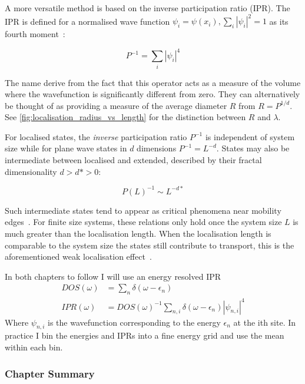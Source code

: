A more versatile method is based on the inverse participation ratio (IPR). The IPR is defined for a normalised wave function \(\psi_i = \psi(x_i), \sum_i |\psi_i|^2 = 1\) as its fourth moment~\autocite{kramerLocalizationTheoryExperiment1993}:

\[
P^{-1} = \sum_i |\psi_i|^4
\]

The name derive from the fact that this operator acts as a measure of the volume where the wavefunction is significantly different from zero. They can alternatively be thought of as providing a measure of the average diameter \(R\) from \(R = P^{1/d}\). See \cref{fig:localisation_radius_vs_length} for the distinction between \(R\) and \(\lambda\).

For localised states, the \emph{inverse} participation ratio \(P^{-1}\) is independent of system size while for plane wave states in \(d\) dimensions \(P^{-1} = L^{-d}\). States may also be intermediate between localised and extended, described by their fractal dimensionality \(d > d* > 0\):

\[
P(L)^{-1} \sim L^{-d*} 
\]

Such intermediate states tend to appear as critical phenomena near mobility edges~\autocite{eversAndersonTransitions2008}. For finite size systems, these relations only hold once the system size \(L\) is much greater than the localisation length. When the localisation length is comparable to the system size the states still contribute to transport, this is the aforementioned weak localisation effect~\autocite{altshulerMagnetoresistanceHallEffect1980,dattaElectronicTransportMesoscopic1995}.

In both chapters to follow I will use an energy resolved IPR \[
\begin{aligned}
DOS(\omega) &= \sum_n \delta(\omega - \epsilon_n)\\
IPR(\omega) &= DOS(\omega)^{-1} \sum_{n,i} \delta(\omega - \epsilon_n) |\psi_{n,i}|^4
\end{aligned}
\] Where \(\psi_{n,i}\) is the wavefunction corresponding to the energy \(\epsilon_n\) at the ith site. In practice I bin the energies and IPRs into a fine energy grid and use the mean within each bin.

\hypertarget{chapter-summary}{%
\subsubsection{Chapter Summary}\label{chapter-summary}}

